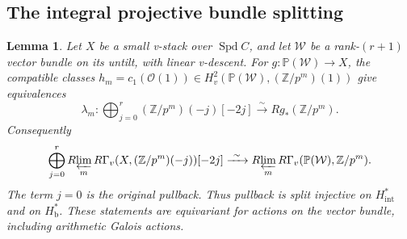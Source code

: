 \documentclass[11pt]{article}
\numberwithin{equation}{section}
\newtheorem{lemma}[theorem]{Lemma}
\theoremstyle{definition}
\theoremstyle{remark}
\begin{document}
\subsection{The integral projective bundle splitting}

\begin{lemma}\label{lem:projective-bundle}
Let $X$ be a small v-stack over $\operatorname{Spd} C$, and let $\mathcal W$ be a
rank-$(r+1)$ vector bundle on its untilt, with linear v-descent.
For $g:\mathbb P(\mathcal W)\to X$, the compatible classes
$h_m=c_1(\mathcal O(1))\in H_v^2(\mathbb P(\mathcal W),(\mathbb Z/p^m)(1))$
give equivalences
\begin{equation}\label{eq:projective-finite}
 \lambda_m:
 \bigoplus_{j=0}^r(\mathbb Z/p^m)(-j)[-2j]
       \xrightarrow{\ \sim\ } Rg_*(\mathbb Z/p^m).
\end{equation}
Consequently
\begin{equation}\label{eq:projective-integral}
 \bigoplus_{j=0}^r
  R\!\varprojlim_m R\Gamma_v(X,(\mathbb Z/p^m)(-j))[-2j]
 \xrightarrow{\ \sim\ }
  R\!\varprojlim_m R\Gamma_v(\mathbb P(\mathcal W),\mathbb Z/p^m).
\end{equation}
The term $j=0$ is the original pullback.  Thus pullback is split
injective on $H^*_{\mathrm{int}}$ and on $H^*_{\mathrm b}$.
These statements are equivariant for actions on the vector bundle,
including arithmetic Galois actions.
\end{lemma}
\end{document}
